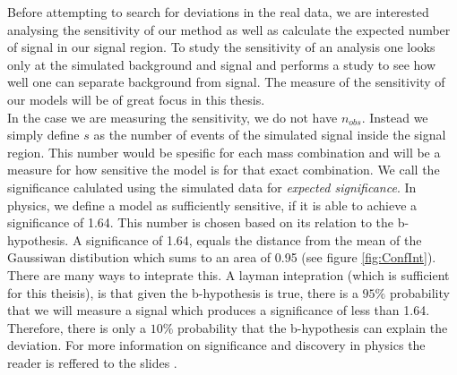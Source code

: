 Before attempting to search for deviations in the real data, we are interested analysing the sensitivity of our method as well 
as calculate the expected number of signal in our signal region. To study the sensitivity of an analysis one looks only at the 
simulated background and signal and performs a study to see how well one can separate background from signal. The measure of the sensitivity 
of our models will be of great focus in this thesis.
\\
In the case we are measuring the sensitivity, we do not have $n_{obs}$. Instead we simply define $s$ as the number of events of the simulated signal 
inside the signal region. This number would be spesific for each mass combination and will be a measure for how sensitive 
the model is for that exact combination. We call the significance calulated using the simulated data for \emph{expected significance}. 
In physics, we define a model as sufficiently sensitive, if it is able to achieve a significance of 1.64. This number is chosen based on 
its relation to the b-hypothesis. A significance of 1.64, equals the distance from the mean of the Gaussiwan distibution which sums to an area of 
0.95 (see figure \ref{fig:ConfInt}). There are many ways to inteprate this. A layman intepration (which is sufficient for this theisis), is 
that given the b-hypothesis is true, there is a $95\%$ probability that we will measure a signal which produces a significance of less than 
1.64. Therefore, there is only a $10\%$ probability that the b-hypothesis can explain the deviation. For more information on significance and 
discovery in physics the reader is reffered to the slides \cite{magnar}.